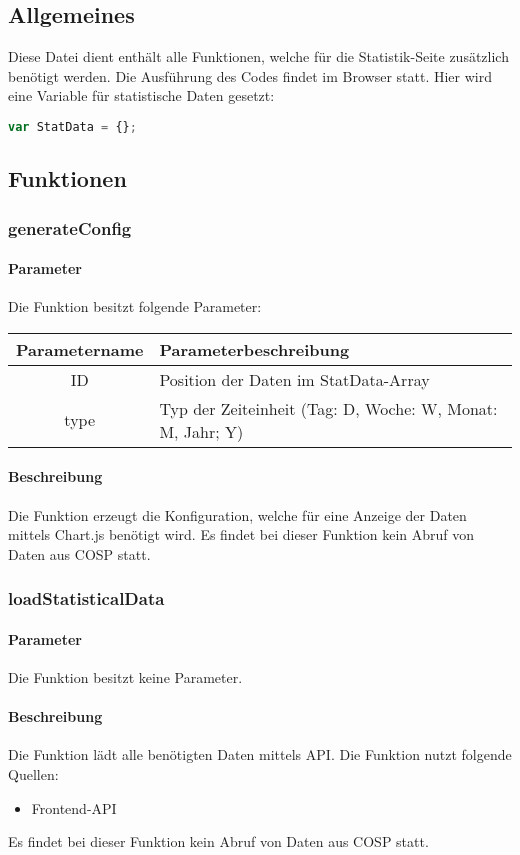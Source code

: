 \subsection{Allgemeines} Diese Datei dient enthält alle Funktionen, welche für die Statistik-Seite zusätzlich benötigt werden.
Die Ausführung des Codes findet im Browser statt. Hier wird eine Variable für statistische Daten gesetzt:
\begin{lstlisting}[language=JavaScript]
var StatData = {};
\end{lstlisting} 
\subsection{Funktionen}
\subsubsection{generateConfig}
\paragraph{Parameter} Die Funktion besitzt folgende Parameter:
\begin{table}[H]
	\begin{tabular}{|c|p{11cm}|}
		\hline
		\textbf{Parametername} & \textbf{Parameterbeschreibung} \\ \hline
		ID   & Position der Daten im {\glqq StatData\grqq}-Array \\ \hline
		type & Typ der Zeiteinheit (Tag: D, Woche: W, Monat: M, Jahr; Y) \\ \hline
	\end{tabular}
\end{table}
\paragraph{Beschreibung} Die Funktion erzeugt die Konfiguration, welche für eine Anzeige der Daten mittels {\glqq Chart.js\grqq} benötigt wird. Es findet bei dieser Funktion kein Abruf von Daten aus {\glqq COSP\grqq} statt.
\subsubsection{loadStatisticalData}
\paragraph{Parameter} Die Funktion besitzt keine Parameter.
\paragraph{Beschreibung} Die Funktion lädt alle benötigten Daten mittels API. Die Funktion nutzt folgende Quellen:
\begin{itemize}
	\item Frontend-API
\end{itemize}
Es findet bei dieser Funktion kein Abruf von Daten aus {\glqq COSP\grqq} statt.
